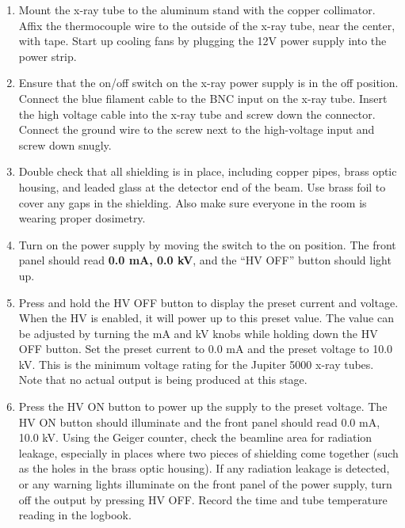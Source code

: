 \begin{enumerate}

\item Mount the x-ray tube to the aluminum stand with the copper
  collimator. Affix the thermocouple wire to the outside of the x-ray tube, near
  the center, with tape. Start up cooling fans by plugging the 12V power supply
  into the power strip.

\item Ensure that the on/off switch on the x-ray power supply is in the off
  position. Connect the blue filament cable to the BNC input on the x-ray
  tube. Insert the high voltage cable into the x-ray tube and screw down the
  connector. Connect the ground wire to the screw next to the high-voltage input
  and screw down snugly.

\item Double check that all shielding is in place, including copper pipes, brass
  optic housing, and leaded glass at the detector end of the beam. Use brass
  foil to cover any gaps in the shielding. Also make sure everyone in the room
  is wearing proper dosimetry.

\item Turn on the power supply by moving the switch to the on position. The
  front panel should read \textbf{0.0 mA, 0.0 kV}, and the “HV OFF” button
  should light up.

\item Press and hold the HV OFF button to display the preset current and
  voltage. When the HV is enabled, it will power up to this preset value. The
  value can be adjusted by turning the mA and kV knobs while holding down the HV
  OFF button. Set the preset current to 0.0 mA and the preset voltage to 10.0
  kV. This is the minimum voltage rating for the Jupiter 5000 x-ray tubes. Note
  that no actual output is being produced at this stage.

\item \label{item:on} Press the HV ON button to power up the supply to the
  preset voltage. The HV ON button should illuminate and the front panel should
  read 0.0 mA, 10.0 kV. Using the Geiger counter, check the beamline area for
  radiation leakage, especially in places where two pieces of shielding come
  together (such as the holes in the brass optic housing). If any radiation
  leakage is detected, or any warning lights illuminate on the front panel of
  the power supply, turn off the output by pressing HV OFF. Record the time and
  tube temperature reading in the logbook.


\end{enumerate}
